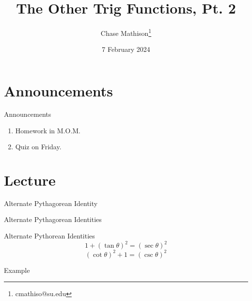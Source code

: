 \documentclass[presentation]{beamer}
\institute[SU]{Shenandoah University}
\author{Chase Mathison\thanks{cmathiso@su.edu}}
\date{7 February 2024}
\title{The Other Trig Functions, Pt. 2}
\begin{document}
\maketitle

\section{Announcements}
\label{sec:org1729c50}
\begin{frame}[label={sec:org34ed8b9}]{Announcements}
\begin{enumerate}
\item Homework in M.O.M.
\item Quiz on Friday.
\end{enumerate}
\end{frame}

\section{Lecture}
\label{sec:org6357d3b}
\begin{frame}[label={sec:org734230a}]{Alternate Pythagorean Identity}
\end{frame}

\begin{frame}[label={sec:org050a0bd}]{Alternate Pythagorean Identities}
\begin{block}{Alternate Pythorean Identities}
\[ 1 + \left( \tan\theta \right)^2 = \left( \sec\theta \right)^2 \]
\[ \left( \cot\theta \right)^2 + 1 = \left( \csc\theta \right)^2 \]
\end{block}
\end{frame}

\begin{frame}[label={sec:org4b8d907}]{Example}
\end{frame}
\end{document}
